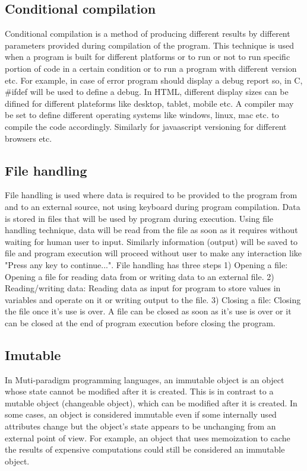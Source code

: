 \documentclass{sig-alternate}
\begin{document}
	\subsection{Conditional compilation}
	Conditional compilation is a method of producing different results by different parameters provided during compilation of the program. This technique is used when a program is built for different platforms or to run or not to run specific portion of code in a certain condition or to run a program with different version etc. For example, in case of error program should display a debug report so, in C, \#ifdef will be used to define a debug. In HTML, different display sizes can be difined for different plateforms like desktop, tablet, mobile etc. A compiler may be set to define different operating systems like windows, linux, mac etc. to compile the code accordingly. Similarly for javaascript versioning for different browsers etc. 
	\subsection{File handling}
	File handling is used where data is required to be provided to the program from and to an external source, not using keyboard during program compilation. Data is stored in files that will be used by program during execution. Using file handling technique, data will be read from the file as soon as it requires without waiting for human user to input. Similarly information (output) will be saved to file and program execution will proceed without user to make any interaction like "Press any key to continue...". File handling has three steps 1) Opening a file: Opening a file for reading data from or writing data to an external file. 2) Reading/writing data: Reading data as input for program to store values in variables and operate on it or writing output to the file. 3) Closing a file: Closing the file once it's use is over. A file can be closed as soon as it's use is over or it can be closed at the end of program execution before closing the program.
	\subsection{Imutable}
	In Muti-paradigm programming languages, an immutable object is an object whose state cannot be modified after it is created. This is in contrast to a mutable object (changeable object), which can be modified after it is created. In some cases, an object is considered immutable even if some internally used attributes change but the object's state appears to be unchanging from an external point of view. For example, an object that uses memoization to cache the results of expensive computations could still be considered an immutable object.
	
\end{document}
